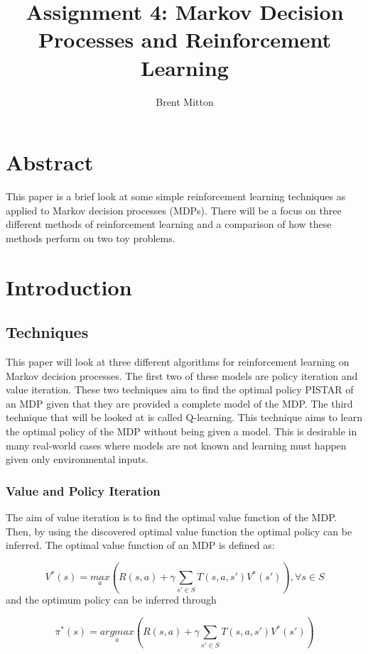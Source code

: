 \documentclass[a4paper,10pt]{article}
\title{Assignment 4: Markov Decision Processes and Reinforcement Learning}
\author{Brent Mitton}
\begin{document}
\maketitle

\section{Abstract}
This paper is a brief look at some simple reinforcement learning techniques as applied to Markov decision processes (MDPs). There will be a focus on three different methods of reinforcement learning and a comparison of how these methods perform on two toy problems.

\section{Introduction}
\subsection{Techniques}
This paper will look at three different algorithms for reinforcement learning on Markov decision processes. The first two of these models are policy iteration and value iteration. These two techniques aim to find the optimal policy PISTAR of an MDP given that they are provided a complete model of the MDP. The third technique that will be looked at is called Q-learning. This technique aims to learn the optimal policy of the MDP without being given a model. This is desirable in many real-world cases where models are not known and learning must happen given only environmental inputs.

\subsubsection{Value and Policy Iteration}
The aim of value iteration is to find the optimal value function of the MDP. Then, by using the discovered optimal value function the optimal policy can be inferred. The optimal value function of an MDP is defined as:

\begin{equation}
V^*(s) = \underset{a}{max} (R(s,a) + \gamma \sum\limits_{s' \in S} T(s, a, s') V^*(s')), \forall s\in S
\end{equation}
and the optimum policy can be inferred through

\begin{equation}
\pi^*(s) = \underset{a}{argmax}(R(s,a) + \gamma \sum\limits_{s' \in S} T(s,a,s') V^*(s'))
\end{equation}
\end{document}
